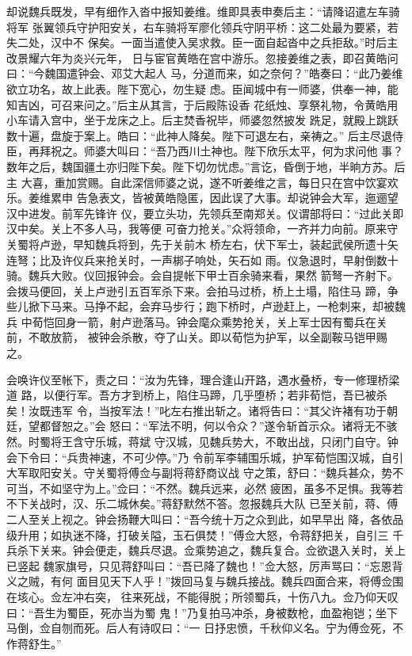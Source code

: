 却说魏兵既发，早有细作入沓中报知姜维。维即具表申奏后主：“请降诏遣左车骑将军
张翼领兵守护阳安关，右车骑将军廖化领兵守阴平桥：这二处最为要紧，若失二处，汉中不
保矣。一面当遣使入吴求救。臣一面自起沓中之兵拒敌。”时后主改景耀六年为炎兴元年，
日与宦官黄皓在宫中游乐。忽接姜维之表，即召黄皓问曰：“今魏国遣钟会、邓艾大起人
马，分道而来，如之奈何？”皓奏曰：“此乃姜维欲立功名，故上此表。陛下宽心，勿生疑
虑。臣闻城中有一师婆，供奉一神，能知吉凶，可召来问之。”后主从其言，于后殿陈设香
花纸烛、享祭礼物，令黄皓用小车请入宫中，坐于龙床之上。后主焚香祝毕，师婆忽然披发
跣足，就殿上跳跃数十遍，盘旋于案上。皓曰：“此神人降矣。陛下可退左右，亲祷之。”
后主尽退侍臣，再拜祝之。师婆大叫曰：“吾乃西川土神也。陛下欣乐太平，何为求问他
事？数年之后，魏国疆土亦归陛下矣。陛下切勿忧虑。”言讫，昏倒于地，半晌方苏。后主
大喜，重加赏赐。自此深信师婆之说，遂不听姜维之言，每日只在宫中饮宴欢乐。姜维累申
告急表文，皆被黄皓隐匿，因此误了大事。却说钟会大军，迤逦望汉中进发。前军先锋许
仪，要立头功，先领兵至南郑关。仪谓部将曰：“过此关即汉中矣。关上不多人马，我等便
可奋力抢关。”众将领命，一齐并力向前。原来守关蜀将卢逊，早知魏兵将到，先于关前木
桥左右，伏下军士，装起武侯所遗十矢连弩；比及许仪兵来抢关时，一声梆子响处，矢石如
雨。仪急退时，早射倒数十骑。魏兵大败。仪回报钟会。会自提帐下甲士百余骑来看，果然
箭弩一齐射下。会拨马便回，关上卢逊引五百军杀下来。会拍马过桥，桥上土塌，陷住马
蹄，争些儿掀下马来。马挣不起，会弃马步行；跑下桥时，卢逊赶上，一枪刺来，却被魏兵
中荀恺回身一箭，射卢逊落马。钟会麾众乘势抢关，关上军士因有蜀兵在关前，不敢放箭，
被钟会杀散，夺了山关。即以荀恺为护军，以全副鞍马铠甲赐之。

会唤许仪至帐下，责之曰：“汝为先锋，理合逢山开路，遇水叠桥，专一修理桥梁道
路，以便行军。吾方才到桥上，陷住马蹄，几乎堕桥；若非荀恺，吾已被杀矣！汝既违军
令，当按军法！”叱左右推出斩之。诸将告曰：“其父许褚有功于朝廷，望都督恕之。”会
怒曰：“军法不明，何以令众？”遂令斩首示众。诸将无不骇然。时蜀将王含守乐城，蒋斌
守汉城，见魏兵势大，不敢出战，只闭门自守。钟会下令曰：“兵贵神速，不可少停。”乃
令前军李辅围乐城，护军荀恺围汉城，自引大军取阳安关。守关蜀将傅佥与副将蒋舒商议战
守之策，舒曰：“魏兵甚众，势不可当，不如坚守为上。”佥曰：“不然。魏兵远来，必然
疲困，虽多不足惧。我等若不下关战时，汉、乐二城休矣。”蒋舒默然不答。忽报魏兵大队
已至关前，蒋、傅二人至关上视之。钟会扬鞭大叫曰：“吾今统十万之众到此，如早早出
降，各依品级升用；如执迷不降，打破关隘，玉石俱焚！”傅佥大怒，令蒋舒把关，自引三
千兵杀下关来。钟会便走，魏兵尽退。佥乘势追之，魏兵复合。佥欲退入关时，关上已竖起
魏家旗号，只见蒋舒叫曰：“吾已降了魏也！”佥大怒，厉声骂曰：“忘恩背义之贼，有何
面目见天下人乎！”拨回马复与魏兵接战。魏兵四面合来，将傅佥围在垓心。佥左冲右突，
往来死战，不能得脱；所领蜀兵，十伤八九。佥乃仰天叹曰：“吾生为蜀臣，死亦当为蜀
鬼！”乃复拍马冲杀，身被数枪，血盈袍铠；坐下马倒，佥自刎而死。后人有诗叹曰：“一
日抒忠愤，千秋仰义名。宁为傅佥死，不作蒋舒生。”

